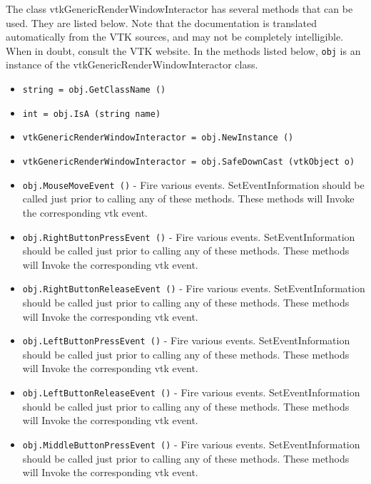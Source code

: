 The class vtkGenericRenderWindowInteractor has several methods that can be used.
  They are listed below.
Note that the documentation is translated automatically from the VTK sources,
and may not be completely intelligible.  When in doubt, consult the VTK website.
In the methods listed below, \verb|obj| is an instance of the vtkGenericRenderWindowInteractor class.
\begin{itemize}
\item  \verb|string = obj.GetClassName ()|

\item  \verb|int = obj.IsA (string name)|

\item  \verb|vtkGenericRenderWindowInteractor = obj.NewInstance ()|

\item  \verb|vtkGenericRenderWindowInteractor = obj.SafeDownCast (vtkObject o)|

\item  \verb|obj.MouseMoveEvent ()| -  Fire various events. SetEventInformation should be called just prior
 to calling any of these methods. These methods will Invoke the
 corresponding vtk event.

\item  \verb|obj.RightButtonPressEvent ()| -  Fire various events. SetEventInformation should be called just prior
 to calling any of these methods. These methods will Invoke the
 corresponding vtk event.

\item  \verb|obj.RightButtonReleaseEvent ()| -  Fire various events. SetEventInformation should be called just prior
 to calling any of these methods. These methods will Invoke the
 corresponding vtk event.

\item  \verb|obj.LeftButtonPressEvent ()| -  Fire various events. SetEventInformation should be called just prior
 to calling any of these methods. These methods will Invoke the
 corresponding vtk event.

\item  \verb|obj.LeftButtonReleaseEvent ()| -  Fire various events. SetEventInformation should be called just prior
 to calling any of these methods. These methods will Invoke the
 corresponding vtk event.

\item  \verb|obj.MiddleButtonPressEvent ()| -  Fire various events. SetEventInformation should be called just prior
 to calling any of these methods. These methods will Invoke the
 corresponding vtk event.


\end{itemize}
